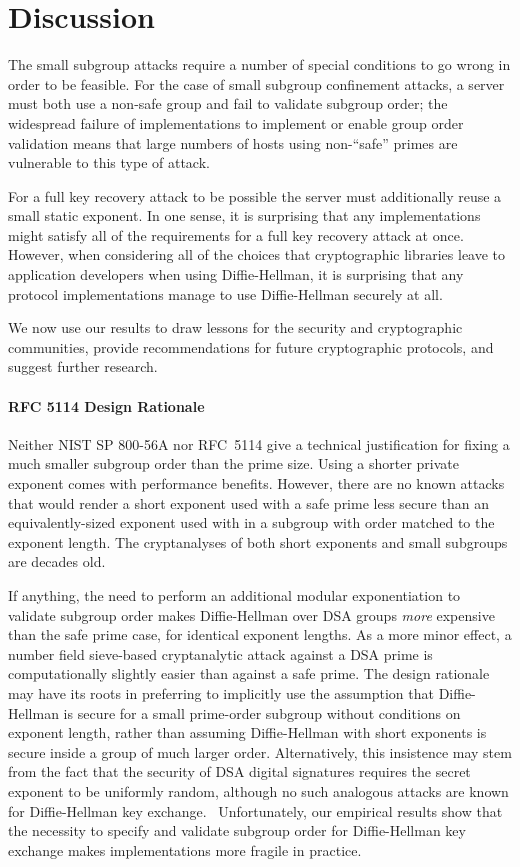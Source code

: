 
\section{Discussion}

The small subgroup attacks require a number of special conditions to go wrong
in order to be feasible. For the case of small subgroup confinement attacks, a
server must both use a non-safe group and fail to validate subgroup order; the
widespread failure of implementations to implement or enable group order validation
means that large numbers of hosts using non-``safe'' primes are vulnerable to this type of attack.

For a full key recovery attack to be possible the server must additionally
reuse a small static exponent.  In one sense, it is surprising that any
implementations might satisfy all of the requirements for a full key recovery
attack at once.  However, when considering all of the choices that
cryptographic libraries leave to application developers when using
Diffie-Hellman, it is surprising that any protocol implementations manage to
use Diffie-Hellman securely at all. 

We now use our results to draw lessons for the security and cryptographic
communities, provide recommendations for future cryptographic protocols, and
suggest further research.

\paragraph{RFC 5114 Design Rationale} Neither NIST SP 800-56A nor RFC~5114 give
a technical justification for fixing a much smaller subgroup order than the
prime size. Using a shorter private exponent comes with performance benefits.
However, there are no known attacks that would render a short exponent used with
a safe prime less secure than an equivalently-sized exponent used with in a
subgroup with order matched to the exponent length. The cryptanalyses of both short 
exponents and small subgroups are decades old.

If anything, the need to
perform an additional modular exponentiation to validate subgroup order makes
Diffie-Hellman over DSA groups \textit{more} expensive than the safe prime
case, for identical exponent lengths. As a more minor effect, a number field
sieve-based cryptanalytic attack against a DSA prime is computationally
slightly easier than against a safe prime.  The design rationale may have its
roots in preferring to implicitly use the assumption that Diffie-Hellman is
secure for a small prime-order subgroup without conditions on exponent length,
rather than assuming Diffie-Hellman with short exponents is secure inside a
group of much larger order.  Alternatively, this insistence may stem from the
fact that the security of DSA digital signatures requires the secret exponent
to be uniformly random, although no such analogous attacks are known for
Diffie-Hellman key exchange.~\cite{Nguyen2002}
Unfortunately, our empirical results show that the necessity to specify and validate subgroup order for Diffie-Hellman key exchange makes implementations more fragile in practice.

